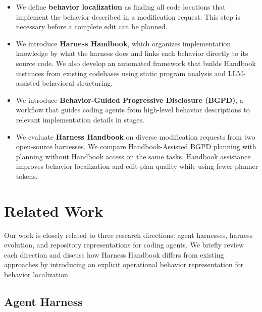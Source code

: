 \documentclass[]{ailab}
\begin{document}
\begin{itemize}

\item We define \textbf{behavior localization} as finding all code locations
that implement the behavior described in a modification request. This step is
necessary before a complete edit can be planned.

\item We introduce \textbf{Harness Handbook}, which organizes implementation
knowledge by what the harness does and links each behavior directly to its
source code. We also develop an automated framework that builds Handbook
instances from existing codebases using static program analysis and LLM-assisted
behavioral structuring.

\item We introduce \textbf{Behavior-Guided Progressive Disclosure (BGPD)}, a
workflow that guides coding agents from high-level behavior descriptions to
relevant implementation details in stages.

\item We evaluate \textbf{Harness Handbook} on diverse modification requests
from two open-source harnesses. We compare Handbook-Assisted BGPD planning with
planning without Handbook access on the same tasks. Handbook assistance improves
behavior localization and edit-plan quality while using fewer planner tokens.

\end{itemize}


\section{Related Work}

Our work is closely related to three research directions: agent harnesses, harness evolution, and repository representations for coding agents. We briefly review each direction and discuss how Harness Handbook differs from existing approaches by introducing an explicit operational behavior representation for behavior localization.

\subsection{Agent Harness}
\end{document}
